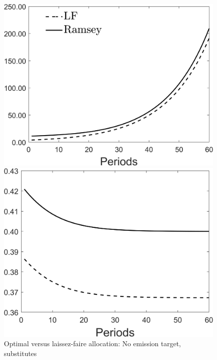 \begin{figure}[h!!]
	\centering
	\caption{Optimal versus laissez-faire allocation: No emission target, substitutes }\label{fig:optallo_subs}
	\begin{minipage}[]{0.32\textwidth}
		\includegraphics[width=1\textwidth]{../codding_model/Own/figures/Rep_agent/staticRam_LF_separate_c_periods59_eppsilon4.00_zeta1.40_Ad08_Ac04_thetac0.70_thetad0.56_HetGrowth1_tauul0.181_util0_withtarget0_lgd1.png}
	\end{minipage}
	\begin{minipage}[]{0.32\textwidth}
		\includegraphics[width=1\textwidth]{../codding_model/Own/figures/Rep_agent/staticRam_LF_separate_hh_periods59_eppsilon4.00_zeta1.40_Ad08_Ac04_thetac0.70_thetad0.56_HetGrowth1_tauul0.181_util0_withtarget0_lgd0.png}

\end{minipage}
\end{figure}
